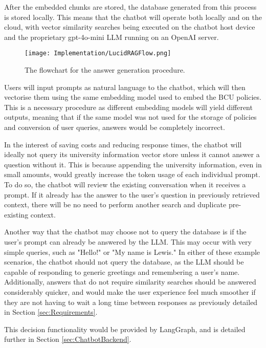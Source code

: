 \para After the embedded chunks are stored, the database generated from this process is stored locally. This means that the chatbot will operate 
both locally and on the cloud, with vector similarity searches being executed on the chatbot host device and the proprietary gpt-4o-mini LLM running 
on an OpenAI server.

\begin{figure}[H]
    \centering
    \texttt{[image: Implementation/LucidRAGFlow.png]}
    \caption{The flowchart for the answer generation procedure.\label{fig:RAGFlowchart}}
\end{figure}

\noindent Users will input prompts as natural language to the chatbot, which will then vectorise them using the same embedding model used 
to embed the BCU policies. This is a necessary procedure as different embedding models will yield different outputs, meaning that if the same 
model was not used for the storage of policies and conversion of user queries, answers would be completely incorrect. 

\para In the interest of saving costs and reducing response times, the chatbot will ideally not query its university information vector store 
unless it cannot answer a question without it. This is because appending the university information, even in small amounts, would 
greatly increase the token usage of each individual prompt. To do so, the chatbot will review the existing conversation when it receives a 
prompt. If it already has the answer to the user's question in previously retrieved context, there will be no need to perform another search 
and duplicate pre-existing context.

\para Another way that the chatbot may choose not to query the database is if the user's prompt can already be answered by the LLM. This may 
occur with very simple queries, such as "Hello!" or "My name is Lewis." In either of these example scenarios, the chatbot should not query the 
database, as the LLM should be capable of responding to generic greetings and remembering a user's name. Additionally, answers that do not 
require similarity searches should be answered considerably quicker, and would make the user experience feel much smoother if they are not 
having to wait a long time between responses as previously detailed in Section \ref{sec:Requirements}. 

\para This decision functionality would be provided by LangGraph, and is detailed 
further in Section \ref{sec:ChatbotBackend}.



